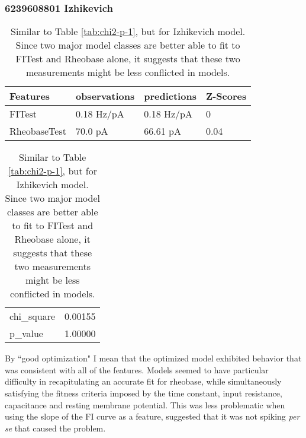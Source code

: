 
\subsubsection{6239608801 Izhikevich}




\begin{table}
\begin{center}
\begin{tabular}{|l|l|l|l|}
\toprule
Features & observations &   predictions & Z-Scores \\
\midrule
FITest       &   0.18 Hz/pA &  0.18 Hz/pA &        0 \\
RheobaseTest &      70.0 pA &      66.61 pA &     0.04 \\
\bottomrule
\end{tabular}
\end{center}
\begin{center}
\begin{tabular}{|l|r|}
\toprule
chi\_square &  0.00155 \\
p\_value    &  1.00000 \\
\bottomrule
\end{tabular}
\caption[Quality of Fit to Experimental Data]{Similar to Table \ref{tab:chi2-p-1}, but for Izhikevich model. Since two major model classes are better able to fit to FITest and Rheobase alone, it suggests that these two measurements might be less conflicted in models.
}
\end{center}
\end{table}


By ``good optimization" I mean that the optimized model exhibited behavior that was consistent with all of the features.
Models seemed to have particular difficulty in recapitulating an accurate fit for rheobase, while simultaneously satisfying the fitness criteria imposed by the time constant, input resistance, capacitance and resting membrane potential.
This was less problematic when using the slope of the FI curve as a feature, suggested that it was not spiking \emph{per se} that caused the problem.

